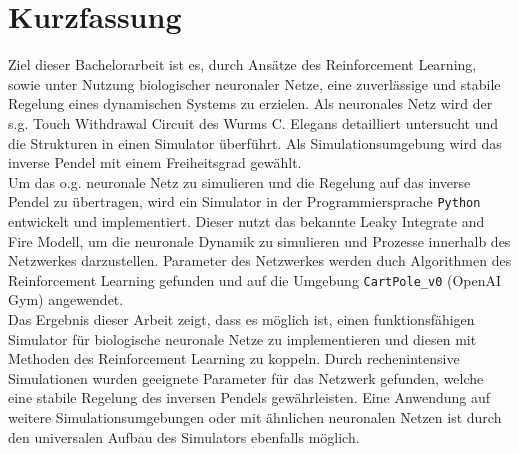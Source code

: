 \section*{Kurzfassung}
%
Ziel dieser Bachelorarbeit ist es, durch Ansätze des Reinforcement Learning, sowie unter Nutzung biologischer neuronaler Netze, eine zuverlässige und stabile Regelung eines dynamischen Systems zu erzielen. Als neuronales Netz wird der s.g. \glqq Touch Withdrawal Circuit\grqq{} des Wurms C. Elegans detailliert untersucht und die Strukturen in einen Simulator überführt. Als Simulationsumgebung wird das inverse Pendel mit einem Freiheitsgrad gewählt.\\
Um das o.g. neuronale Netz zu simulieren und die Regelung auf das inverse Pendel zu übertragen, wird ein Simulator in der Programmiersprache \texttt{Python} entwickelt und implementiert. Dieser nutzt das bekannte Leaky Integrate and Fire Modell, um die neuronale Dynamik zu simulieren und Prozesse innerhalb des Netzwerkes darzustellen. Parameter des Netzwerkes werden duch Algorithmen des Reinforcement Learning gefunden und auf die Umgebung \texttt{CartPole\_v0} (OpenAI Gym) angewendet.\\
Das Ergebnis dieser Arbeit zeigt, dass es möglich ist, einen funktionsfähigen Simulator für biologische neuronale Netze zu implementieren und diesen mit Methoden des Reinforcement Learning zu koppeln. Durch rechenintensive Simulationen wurden geeignete Parameter für das Netzwerk gefunden, welche eine stabile Regelung des inversen Pendels gewährleisten. Eine Anwendung auf weitere Simulationsumgebungen oder mit ähnlichen neuronalen Netzen ist durch den universalen Aufbau des Simulators ebenfalls möglich.

